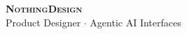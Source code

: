 \begin{center}
    \textbf{\Huge \scshape NothingDesign} \\ \vspace{3pt}
    \small Product Designer $\cdot$ Agentic AI Interfaces
\end{center}
